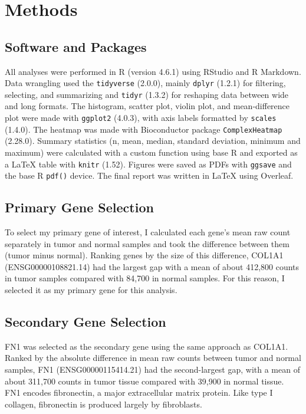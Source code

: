 \documentclass{article}
\begin{document}
\section{Methods}

\subsection{Software and Packages}
All analyses were performed in R (version 4.6.1) using RStudio and R Markdown. Data wrangling used the \texttt{tidyverse} (2.0.0), mainly \texttt{dplyr} (1.2.1) for filtering, selecting, and summarizing and \texttt{tidyr} (1.3.2) for reshaping data between wide and long formats. The histogram, scatter plot, violin plot, and mean-difference plot were made with \texttt{ggplot2} (4.0.3), with axis labels formatted by \texttt{scales} (1.4.0). The heatmap was made with Bioconductor package \texttt{ComplexHeatmap} (2.28.0). Summary statistics (n, mean, median, standard deviation, minimum and maximum) were calculated with a custom function using base R and exported as a LaTeX table with \texttt{knitr} (1.52). Figures were saved as PDFs with \texttt{ggsave} and the base R \texttt{pdf()} device. The final report was written in LaTeX using Overleaf.

\subsection{Primary Gene Selection}
To select my primary gene of interest, I calculated each gene's mean raw count separately in tumor and normal samples and took the difference between them (tumor minus normal). Ranking genes by the size of this difference, COL1A1 (ENSG00000108821.14) had the largest gap with a mean of about 412,800 counts in tumor samples compared with 84,700 in normal samples. For this reason, I selected it as my primary gene for this analysis.

\subsection{Secondary Gene Selection}
FN1 was selected as the secondary gene using the same approach as COL1A1. Ranked by the absolute difference in mean raw counts between tumor and normal samples, FN1 (ENSG00000115414.21) had the second-largest gap, with a mean of about 311,700 counts in tumor tissue compared with 39,900 in normal tissue. FN1 encodes fibronectin, a major extracellular matrix protein. Like type I collagen, fibronectin is produced largely by fibroblasts.
\end{document}
